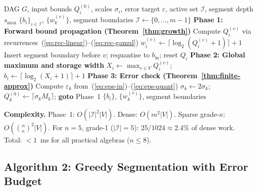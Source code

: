 \documentclass[11pt,a4paper]{article}
\theoremstyle{definition}
\theoremstyle{plain}
\theoremstyle{remark}
\begin{document}
\begin{algorithm}[H]
\caption{Optimal Bit Allocation for L-Rep (Dense and Sparse, with Segmentation)}
\label{alg:bitalloc}
\begin{algorithmic}[1]
\REQUIRE DAG $G$, input bounds $Q_i^{(0)}$, scales $\sigma_i$,
         error target $\varepsilon$, active set $\mathcal{I}$,
         segment depth $s_\mathrm{max}$
\ENSURE $\{b_i\}_{i\in\mathcal{I}}$, $\{w_k^{(v)}\}$, segment boundaries
 $\mathcal{I}\leftarrow\{0,\ldots,m-1\}$ \ENDIF
\STATE \textbf{Phase 1: Forward bound propagation (Theorem~\ref{thm:growth})}
  \STATE Compute $Q_i^{(v)}$ via recurrences~(\ref{eq:rec-linear})--(\ref{eq:rec-gamul})
  \STATE $w_i^{(v)}\leftarrow\lceil\log_2(Q_i^{(v)}+1)\rceil+1$
    \STATE Insert segment boundary before $v$; requantise to $b_\mathrm{in}$; reset $Q_i$
  \ENDIF
\ENDFOR
\STATE \textbf{Phase 2: Global maximum and storage width}
\STATE $X_i\leftarrow\max_{v\in V}Q_i^{(v)}$;
       $b_i\leftarrow\lceil\log_2(X_i+1)\rceil+1$
\STATE \textbf{Phase 3: Error check (Theorem~\ref{thm:finite-approx})}
  \STATE Compute $\varepsilon_k$ from~(\ref{eq:eps-in})--(\ref{eq:eps-quant})
    \STATE $\sigma_k\leftarrow 2\sigma_k$; $Q_k^{(0)}\leftarrow\lceil\sigma_k M_k\rceil$; \textbf{goto} Phase~1
  \ENDIF
\ENDFOR
\RETURN $\{b_i\}$, $\{w_k^{(v)}\}$, segment boundaries
\end{algorithmic}
\end{algorithm}

\textbf{Complexity.}
Phase~1: $O(|\mathcal{I}|^2|V|)$.
Dense: $O(m^2|V|)$.
Sparse grade-$\kappa$: $O(\binom{n}{\kappa}^2|V|)$.
For $n=5$, grade-1 ($|\mathcal{I}|=5$): $25/1024\approx 2.4\%$ of dense work.
Total: $<1$~ms for all practical algebras ($n\le 8$).

\subsection{Algorithm 2: Greedy Segmentation with Error Budget}
\end{document}
